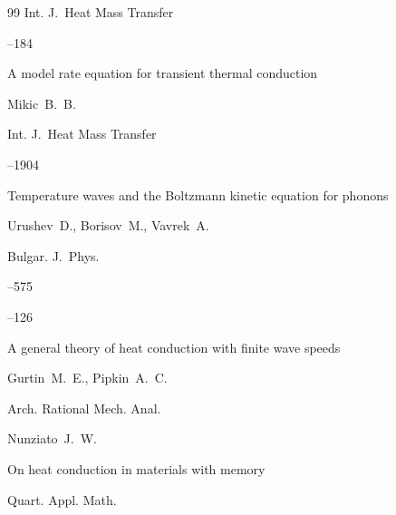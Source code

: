 \begin{thebibliography}{99}
\jour Int. J.~Heat Mass Transfer




--184






\paper A model rate equation for transient thermal conduction

\by   Mikic~B.~B.

\jour Int. J.~Heat Mass Transfer




--1904






\paper 	Temperature waves and the Boltzmann kinetic equation for phonons

\by 	Urushev~D., Borisov~M., Vavrek~A.

\jour 	Bulgar. J.~Phys.




--575







–126

\paper A general theory of heat conduction with finite wave speeds

\by  Gurtin~M.~E., Pipkin~A.~C.


\jour Arch. Rational Mech. Anal. 






\by  Nunziato~J.~W.

\paper On heat conduction in materials with memory 

\jour Quart. Appl. Math. 


\end{thebibliography}
